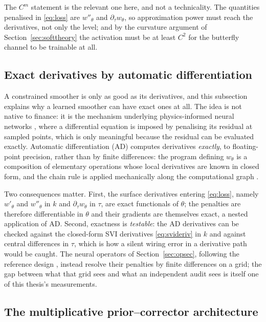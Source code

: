 The $C^m$ statement is the relevant one here, and not a technicality. The quantities penalised
in \eqref{eq:loss} are $w''_\theta$ and $\partial_\tau w_\theta$, so approximation power must
reach the derivatives, not only the level; and by the curvature argument of
Section~\ref{sec:softtheory} the activation must be at least $C^2$ for the butterfly channel to
be trainable at all.

\subsection{Exact derivatives by automatic differentiation}

A constrained smoother is only as good as its derivatives, and this subsection explains why a
learned smoother can have exact ones at all. The idea is not native to finance: it is the
mechanism underlying physics-informed neural networks \cite{raissi2019,lagaris1998}, where a
differential equation is imposed by penalising its residual at sampled points, which is only
meaningful because the residual can be evaluated exactly. Automatic differentiation (AD)
computes derivatives \emph{exactly}, to floating-point precision, rather than by finite
differences:
the program defining $w_\theta$ is a composition of elementary operations whose local
derivatives are known in closed form, and the chain rule is applied mechanically along the
computational graph \cite{baydin2018}.

Two consequences matter. First, the surface derivatives entering \eqref{eq:loss}, namely
$w'_\theta$ and $w''_\theta$ in $k$ and $\partial_\tau w_\theta$ in $\tau$, are exact functionals
of $\theta$; the penalties are therefore differentiable in $\theta$ and their gradients are
themselves exact, a nested application of AD. Second, exactness is \emph{testable}: the AD
derivatives can be checked against the closed-form SVI derivatives \eqref{eq:svideriv} in $k$ and
against central differences in $\tau$, which is how a silent wiring error in a derivative path
would be caught. The neural operators of Section~\ref{sec:opsec}, following the reference design
\cite{wiedemann2025}, instead resolve their penalties by finite differences on a grid; the gap
between what that grid sees and what an independent audit sees is itself one of this thesis's
measurements.

\subsection{The multiplicative prior--corrector architecture}

